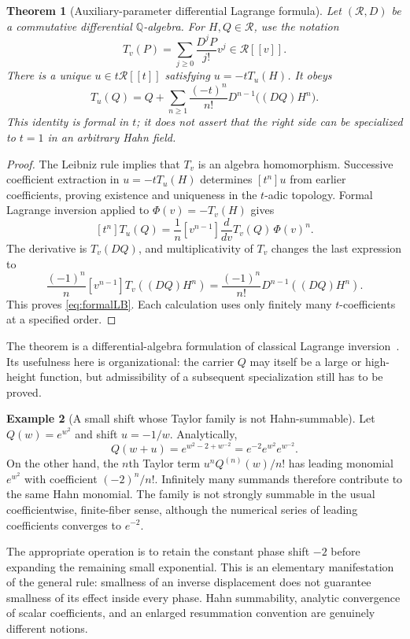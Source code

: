 \documentclass[11pt,a4paper]{article}
\newtheorem{theorem}{Theorem}[section]
\theoremstyle{definition}
\newtheorem{example}[theorem]{Example}
\theoremstyle{remark}
\newcommand{\Q}{\mathbb Q}
\numberwithin{equation}{section}
\begin{document}
\begin{theorem}[Auxiliary-parameter differential Lagrange formula]\label{thm:formalLB}
Let $(\mathcal R,D)$ be a commutative differential $\Q$-algebra. For $H,Q\in\mathcal R$, use the notation
\[
 T_v(P)=\sum_{j\ge0}\frac{D^jP}{j!}v^j\in\mathcal R[[v]].
\]
There is a unique $u\in t\mathcal R[[t]]$ satisfying $u=-tT_u(H)$. It obeys
\begin{equation}\label{eq:formalLB}
 T_u(Q)=Q+\sum_{n\ge1}\frac{(-t)^n}{n!}
 D^{n-1}\bigl((DQ)H^n\bigr).
\end{equation}
This identity is formal in $t$; it does not assert that the right side can be specialized to $t=1$ in an arbitrary Hahn field.
\end{theorem}
\begin{proof}
The Leibniz rule implies that $T_v$ is an algebra homomorphism. Successive coefficient extraction in $u=-tT_u(H)$ determines $[t^n]u$ from earlier coefficients, proving existence and uniqueness in the $t$-adic topology. Formal Lagrange inversion applied to $\Phi(v)=-T_v(H)$ gives
\[
 [t^n]T_u(Q)=\frac1n[v^{n-1}]\frac{d}{dv}T_v(Q)\,\Phi(v)^n.
\]
The derivative is $T_v(DQ)$, and multiplicativity of $T_v$ changes the last expression to
\[
 \frac{(-1)^n}{n}[v^{n-1}]T_v((DQ)H^n)
 =\frac{(-1)^n}{n!}D^{n-1}((DQ)H^n).
\]
This proves \eqref{eq:formalLB}. Each calculation uses only finitely many $t$-coefficients at a specified order.
\end{proof}

The theorem is a differential-algebra formulation of classical Lagrange inversion~\cite{Gessel}. Its usefulness here is organizational: the carrier $Q$ may itself be a large or high-height function, but admissibility of a subsequent specialization still has to be proved.

\begin{example}[A small shift whose Taylor family is not Hahn-summable]\label{ex:hahn}
Let $Q(w)=e^{w^2}$ and shift $u=-1/w$. Analytically,
\[
 Q(w+u)=e^{w^2-2+w^{-2}}=e^{-2}e^{w^2}e^{w^{-2}}.
\]
On the other hand, the $n$th Taylor term $u^nQ^{(n)}(w)/n!$ has leading monomial $e^{w^2}$ with coefficient $(-2)^n/n!$. Infinitely many summands therefore contribute to the same Hahn monomial. The family is not strongly summable in the usual coefficientwise, finite-fiber sense, although the numerical series of leading coefficients converges to $e^{-2}$.
\end{example}

The appropriate operation is to retain the constant phase shift $-2$ before expanding the remaining small exponential. This is an elementary manifestation of the general rule: smallness of an inverse displacement does not guarantee smallness of its effect inside every phase. Hahn summability, analytic convergence of scalar coefficients, and an enlarged resummation convention are genuinely different notions.
\end{document}
